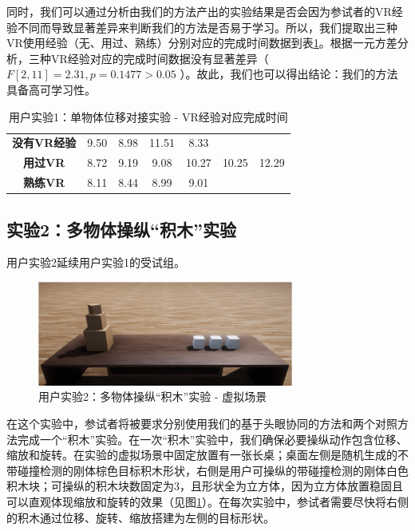 同时，我们可以通过分析由我们的方法产出的实验结果是否会因为参试者的VR经验不同而导致显著差异来判断我们的方法是否易于学习。所以，我们提取出三种VR使用经验（无、用过、熟练）分别对应的完成时间数据到表\ref{table-4-4}。根据一元方差分析，三种VR经验对应的完成时间数据没有显著差异（ $F[2, 11] = 2.31, p = 0.1477 > 0.05$ ）。故此，我们也可以得出结论：我们的方法具备高可学习性。

\begin{table}[t!]
\centering
\begin{tabular}{ccccccc}
\textbf{没有VR经验} & 9.50 & 8.98 & 11.51 & 8.33  &       &       \\
\textbf{用过VR}   & 8.72 & 9.19 & 9.08  & 10.27 & 10.25 & 12.29 \\
\textbf{熟练VR}   & 8.11 & 8.44 & 8.99  & 9.01  &       &      
\end{tabular}
\caption{用户实验1：单物体位移对接实验 - VR经验对应完成时间}
\label{table-4-4}
\end{table}

\subsection{实验2：多物体操纵“积木”实验}

用户实验2延续用户实验1的受试组。

\begin{figure}[b!]
    \centering
    \includegraphics[width=0.75\textwidth]{figure/user-study-2-screenshot.png}
    \caption{用户实验2：多物体操纵“积木”实验 - 虚拟场景}
    \label{fig-4-3}
\end{figure}

在这个实验中，参试者将被要求分别使用我们的基于头眼协同的方法和两个对照方法完成一个“积木”实验。在一次“积木”实验中，我们确保必要操纵动作包含位移、缩放和旋转。在实验的虚拟场景中固定放置有一张长桌；桌面左侧是随机生成的不带碰撞检测的刚体棕色目标积木形状，右侧是用户可操纵的带碰撞检测的刚体白色积木块；可操纵的积木块数固定为3，且形状全为立方体，因为立方体放置稳固且可以直观体现缩放和旋转的效果（见图\ref{fig-4-3}）。在每次实验中，参试者需要尽快将右侧的积木通过位移、旋转、缩放搭建为左侧的目标形状。

